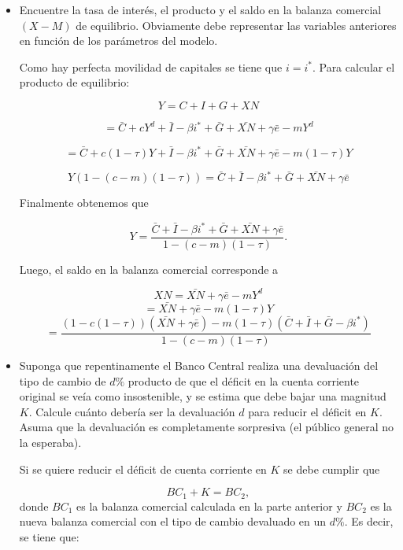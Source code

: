 \documentclass[a4paper]{article}
\begin{document}
\begin{itemize}

\item[a)] Encuentre la tasa de interés, el producto y el saldo en la balanza comercial $(X-M)$ de equilibrio. Obviamente debe representar las variables anteriores en función de los parámetros del modelo.

\begin{solution}
Como hay perfecta movilidad de capitales se tiene que $i = i^*$. Para calcular el producto de equilibrio:

\[
Y = C + I + G + XN
\]

\[
= \bar{C} + cY^d + \bar{I} - \beta i^* + \bar{G} + \bar{XN} + \gamma \bar{e} - mY^d
\]

\[
= \bar{C} + c(1 - \tau)Y + \bar{I} - \beta i^* + \bar{G} + \bar{XN} + \gamma \bar{e} - m(1 - \tau)Y
\]


\[
Y \left(1 - (c - m)(1 - \tau) \right) = \bar{C} + \bar{I} - \beta i^* + \bar{G} + \bar{XN} + \gamma \bar{e}
\]

Finalmente obtenemos que

\[
Y = \frac{\bar{C} + \bar{I} - \beta i^* + \bar{G} + \bar{XN} + \gamma \bar{e}}{1 - (c - m)(1 - \tau)}. \tag{7}
\]

Luego, el saldo en la balanza comercial corresponde a

\[
XN = \bar{XN} + \gamma \bar{e} - mY^d
\]
\[
= \bar{XN} + \gamma \bar{e} - m(1 - \tau)Y
\]
\[
= \frac{(1 - c(1 - \tau))(\bar{XN} + \gamma \bar{e}) - m(1 - \tau)(\bar{C} + \bar{I} + \bar{G} - \beta i^*)}{1 - (c - m)(1 - \tau)}
\]

\end{solution}


    \item[b)] Suponga que repentinamente el Banco Central realiza una devaluación del tipo de cambio de $d\%$ producto de que el déficit en la cuenta corriente original se veía como insostenible, y se estima que debe bajar una magnitud $K$. Calcule cuánto debería ser la devaluación $d$ para reducir el déficit en $K$. Asuma que la devaluación es completamente sorpresiva (el público general no la esperaba).

    \begin{solution}
Si se quiere reducir el déficit de cuenta corriente en $K$ se debe cumplir que

\[
BC_1 + K = BC_2, \tag{8}
\]
donde $BC_1$ es la balanza comercial calculada en la parte anterior y $BC_2$ es la nueva balanza comercial con el tipo de cambio devaluado en un $d\%$. Es decir, se tiene que:


\end{solution}
\end{itemize}
\end{document}
